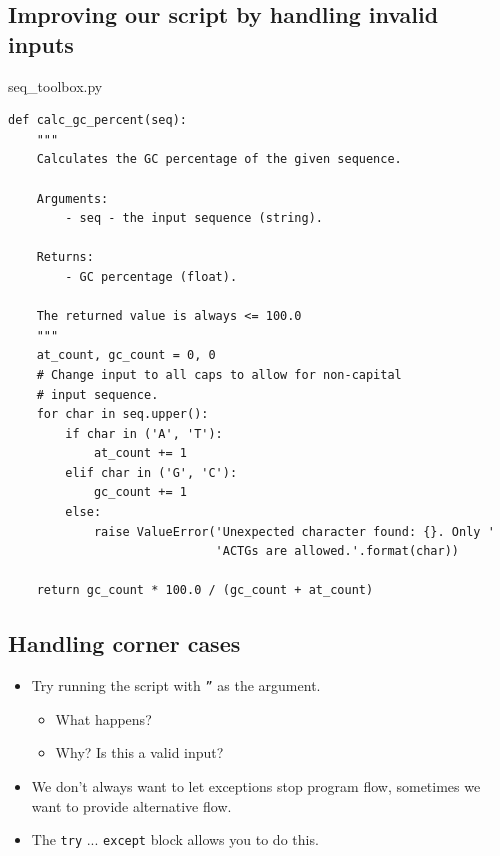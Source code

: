 \documentclass[aspectratio=1610,slidestop]{beamer}
\begin{document}
\subsection{Improving our script by handling invalid inputs}
\begin{pframe}
 \begin{pythonfile}{seq\_toolbox.py}
  \begin{tiny}
  \begin{verbatim}
def calc_gc_percent(seq):
    """
    Calculates the GC percentage of the given sequence.

    Arguments:
        - seq - the input sequence (string).

    Returns:
        - GC percentage (float).

    The returned value is always <= 100.0
    """
    at_count, gc_count = 0, 0
    # Change input to all caps to allow for non-capital
    # input sequence.
    for char in seq.upper():
        if char in ('A', 'T'):
            at_count += 1
        elif char in ('G', 'C'):
            gc_count += 1
        else:
            raise ValueError('Unexpected character found: {}. Only '
                             'ACTGs are allowed.'.format(char))

    return gc_count * 100.0 / (gc_count + at_count)
    \end{verbatim}
  \end{tiny}
 \end{pythonfile}
\end{pframe}


\subsection{Handling corner cases}
\begin{pframe}
 \begin{itemize}
  \item Try running the script with \texttt{''} as the argument.
  \begin{itemize}
   \item What happens?
   \item Why? Is this a valid input?
  \end{itemize}
  \item We don't always want to let exceptions stop program flow,
  sometimes we want to provide alternative flow.
  \item The \texttt{try} ... \texttt{except} block
allows you to do this.
 \end{itemize}
\end{pframe}
\end{document}
